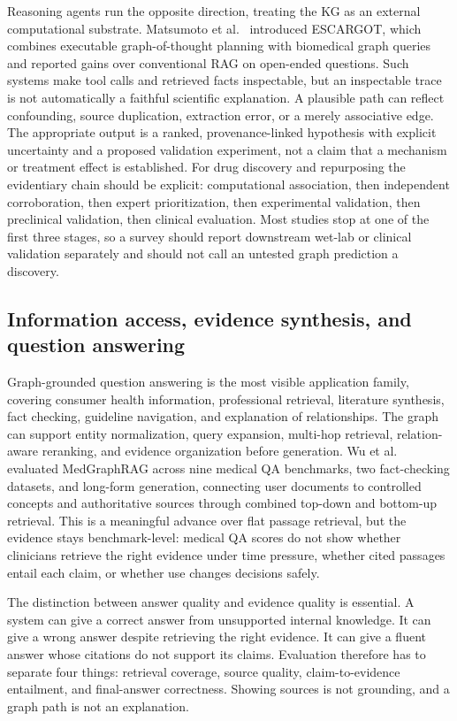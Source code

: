 Reasoning agents run the opposite direction, treating the KG as an external computational substrate. Matsumoto et al.~\cite{matsumoto2025escargot} introduced ESCARGOT, which combines executable graph-of-thought planning with biomedical graph queries and reported gains over conventional RAG on open-ended questions. Such systems make tool calls and retrieved facts inspectable, but an inspectable trace is not automatically a faithful scientific explanation. A plausible path can reflect confounding, source duplication, extraction error, or a merely associative edge. The appropriate output is a ranked, provenance-linked hypothesis with explicit uncertainty and a proposed validation experiment, not a claim that a mechanism or treatment effect is established. For drug discovery and repurposing the evidentiary chain should be explicit: computational association, then independent corroboration, then expert prioritization, then experimental validation, then preclinical validation, then clinical evaluation. Most studies stop at one of the first three stages, so a survey should report downstream wet-lab or clinical validation separately and should not call an untested graph prediction a discovery.

\subsection{Information access, evidence synthesis, and question answering}

Graph-grounded question answering is the most visible application family, covering consumer health information, professional retrieval, literature synthesis, fact checking, guideline navigation, and explanation of relationships. The graph can support entity normalization, query expansion, multi-hop retrieval, relation-aware reranking, and evidence organization before generation. Wu et al.~\cite{wu2025medgraphrag} evaluated MedGraphRAG across nine medical QA benchmarks, two fact-checking datasets, and long-form generation, connecting user documents to controlled concepts and authoritative sources through combined top-down and bottom-up retrieval. This is a meaningful advance over flat passage retrieval, but the evidence stays benchmark-level: medical QA scores do not show whether clinicians retrieve the right evidence under time pressure, whether cited passages entail each claim, or whether use changes decisions safely.

The distinction between answer quality and evidence quality is essential. A system can give a correct answer from unsupported internal knowledge. It can give a wrong answer despite retrieving the right evidence. It can give a fluent answer whose citations do not support its claims. Evaluation therefore has to separate four things: retrieval coverage, source quality, claim-to-evidence entailment, and final-answer correctness. Showing sources is not grounding, and a graph path is not an explanation.

